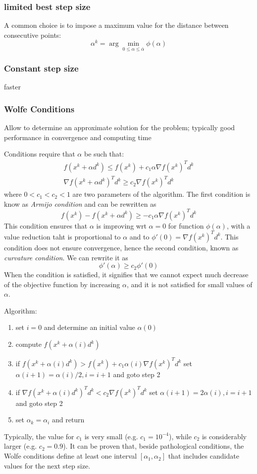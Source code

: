 \documentclass{book}
\theoremstyle{theoremv2}
\theoremstyle{defv2}
\theoremstyle{remark}
\theoremstyle{remark}
\begin{document}
\subsubsection{limited best step size}
A common choice is to impose a maximum value for the distance between consecutive points:
\[
    \alpha^k = \arg \min_{0\leq\alpha\leq \bar{\alpha}} \phi(\alpha)
\]
\subsubsection{Constant step size}
faster
\subsubsection{Wolfe Conditions}
Allow to determine an approximate solution for the problem; typically good performance in convergence and computing time

Conditions require that $\alpha$ be such that:
\begin{gather*}
    f(x^k + \alpha d^k)\leq f(x^k) + c_1\alpha\nabla f(x^k)^T d^k\\
    \nabla f(x^k + \alpha d^k)^T d^k \geq c_2 \nabla f(x^k)^T d^k
\end{gather*}
where $0<c_1<c_2<1$ are two parameters of the algorithm. The first condition is know as \emph{Armijo condition} and can be rewritten as 
\[
    f(x^k)-f(x^k+\alpha d^k) \geq -c_1\alpha\nabla f(x^k)^T d^k
\]
This condition ensures that $\alpha$ is improving wrt $\alpha=0$ for function $\phi(\alpha)$, with a value reduction taht is proportional to $\alpha$ and to $\phi'(0)=\nabla f(x^k)^Td^k$. This condition does not ensure convergence, hence the second condition, known as \emph{curvature condition}. We can rewrite it as 
\[
    \phi'(\alpha) \geq c_2\phi'(0)
\]
When the condition is satisfied, it signifies that we cannot expect much decrease of the objective function by increasing $\alpha$, and it is not satisfied for small values of  $\alpha$. 

Algorithm:
\begin{enumerate}
    \item set $i=0$ and determine an initial value $\alpha(0)$
    \item compute $f(x^k+\alpha(i) d^k)$
    \item if $f(x^k + \alpha(i)d^k) > f(x^k)+c_1 \alpha(i)\nabla f(x^k)^Td^k$ set $\alpha(i+1) = \alpha(i)/2, i=i+1$ and goto step 2
    \item if $\nabla f(x^k+\alpha(i)d^k)^Td^k<c_2\nabla f(x^k)^Td^k$ set $\alpha(i+1) = 2\alpha(i),i=i+1$ and goto step 2 
    \item set $\alpha_k = \alpha_i$ and return
\end{enumerate}
Typically, the value for $c_1$ is very small (e.g. $c_1=10^{-4}$), while $c_2$ is considerably larger (e.g. $c_2 = 0.9$). It can be proven that, beside pathological conditions, the Wolfe conditions define at least one interval $[\alpha_1,\alpha_2]$ that includes candidate values for the next step size.
\end{document}
